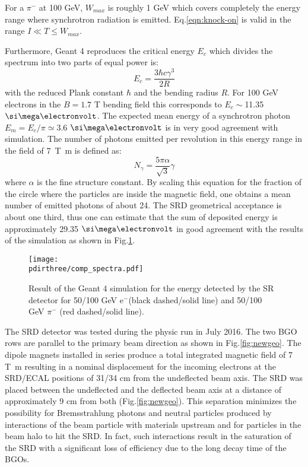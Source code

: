 For a $\pi^-$ at 100 GeV, $W_{max}$ is roughly 1 GeV which
covers completely the energy range where synchrotron radiation is
emitted. Eq.\ref{eqn:knock-on} is valid in the range $I\ll T \leq W_{max}$.
 \par 
Furthermore, Geant 4 reproduces the critical energy $E_c$ which divides the spectrum into two parts of equal power is:
\begin{equation}
E_c = \frac{3 \hbar c \gamma^3}{2R}
\end{equation}
with the reduced Plank constant $\hbar$ and the bending radius $R$. 
 For 100 GeV electrons in the  $B=1.7$ T bending field this corresponds to $E_c\sim$11.35 $\mev$. The expected mean energy of a synchrotron photon $E_m=E_c/\pi\simeq 3.6$ $\mev$ is in very good agreement with simulation. The number of photons emitted per revolution in this energy range in the field of \SI{7}{\tesla\meter} is defined as:
\begin{equation}
N_\gamma = \frac{5 \pi \alpha}{\sqrt{3}}\gamma
\end{equation}
where $\alpha$ is the fine structure constant. 
By scaling this equation for the fraction of the circle where the particles are inside the magnetic field, one obtains a mean number of emitted photons of about 24.
The SRD geometrical acceptance is about one third,  thus one can estimate that the sum of deposited energy is approximately 29.35 $\mev$ in good agreement with the results of the simulation as shown in Fig.\ref{fig:SRspectrum}. 
 
\begin{figure}[htb!]
\centering
\texttt{[image: \\pdirthree/comp\_spectra.pdf]}
\caption[SR spectrum for different energy detected in the SRD]{Result of the Geant 4 simulation for the energy detected by the SR detector for 50/100 GeV e$^-$(black dashed/solid line) and 50/100 GeV $\pi^-$ (red dashed/solid line).}
\label{fig:SRspectrum}
\end{figure}

The SRD detector was tested during the physic run in July 2016. The two BGO rows are parallel to the primary beam direction as shown in Fig.\ref{fig:newgeo}. The dipole magnets installed in series produce a total integrated magnetic field of 7 \si{\tesla\meter} \cite{Banerjee:2016tad} resulting in a nominal displacement for the incoming electrons at the SRD/ECAL positions of 31/34 cm from the undeflected beam axis. The SRD was placed between the undeflected and the deflected beam axis at a distance of approximately 9 cm from both (Fig.\ref{fig:newgeo}). This separation minimizes the possibility for Bremsstrahlung photons and neutral particles produced by interactions of the beam particle with materials upstream and for particles in the beam halo to hit the SRD. In fact, such interactions result in the saturation of the SRD with a significant loss of efficiency due to the long decay time of the BGOs.


